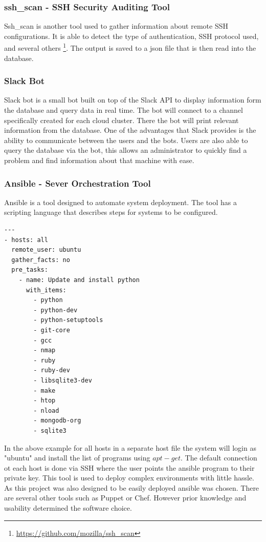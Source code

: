 \documentclass[12pt]{article}
\begin{document}
\subsubsection{ssh\_scan - SSH Security Auditing Tool}
Ssh\_scan is another tool used to gather information about remote SSH configurations. It is able to detect the type of authentication, SSH protocol used, and several others \footnote{\href{https://github.com/mozilla/ssh\_scan}{https://github.com/mozilla/ssh\_scan}}. The output is saved to a json file that is then read into the database.

\subsubsection{Slack Bot}
Slack bot is a small bot built on top of the Slack API to display information form the database and query data in real time. The bot will connect to a channel specifically created for each cloud cluster. There the bot will print relevant information from the database. One of the advantages that Slack provides is the ability to communicate between the users and the bots. Users are also able to query the database via the bot, this allows an administrator to quickly find a problem and find information about that machine with ease.

\subsubsection{Ansible - Sever Orchestration Tool}
Ansible is a tool designed to automate system deployment. The tool has a scripting language that describes steps for systems to be configured.
\newpage
\begin{mdframed}
\begin{lstlisting}
---
- hosts: all
  remote_user: ubuntu
  gather_facts: no
  pre_tasks:
    - name: Update and install python
      with_items:
        - python
        - python-dev
        - python-setuptools
        - git-core
        - gcc
        - nmap
        - ruby
        - ruby-dev
        - libsqlite3-dev
        - make
        - htop
        - nload
        - mongodb-org
        - sqlite3

\end{lstlisting}
\end{mdframed}

In the above example for all hosts in a separate host file the system will login as "ubuntu" and install the list of programs using $apt-get$. The default connection ot each host is done via SSH where the user points the ansible program to their private key.  This tool is used to deploy complex environments with little hassle.  As this project was also designed to be easily deployed ansible was chosen. There are several other tools such as Puppet or Chef. However prior knowledge and usability determined the software choice.
\end{document}
